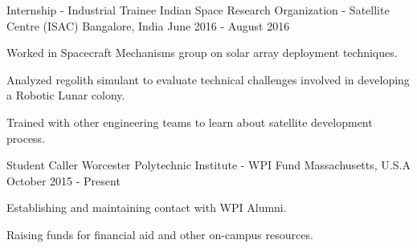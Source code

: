 \vspace{-10pt}
\begin{cventries}
  \cventry
    {Internship - Industrial Trainee}
    {Indian Space Research Organization - Satellite Centre (ISAC)}
    {Bangalore, India}
    {June 2016 - August 2016}
    {
      \begin{cvitems}
        \item {Worked in Spacecraft Mechanisms group on solar array deployment techniques.}
        \item {Analyzed regolith simulant to evaluate technical challenges involved in developing a Robotic Lunar colony.}
        \item{Trained with other engineering teams to learn about satellite development process.}
      \end{cvitems}
    }
\space
  \cventry
    {Student Caller}
    {Worcester Polytechnic Institute - WPI Fund}
    {Massachusetts, U.S.A}
    {October 2015 - Present}
    {
      \begin{cvitems}
        \item {Establishing and maintaining contact with WPI Alumni.}
        \item {Raising funds for financial aid and other on-campus resources.}
      \end{cvitems}
    }

\end{cventries}
